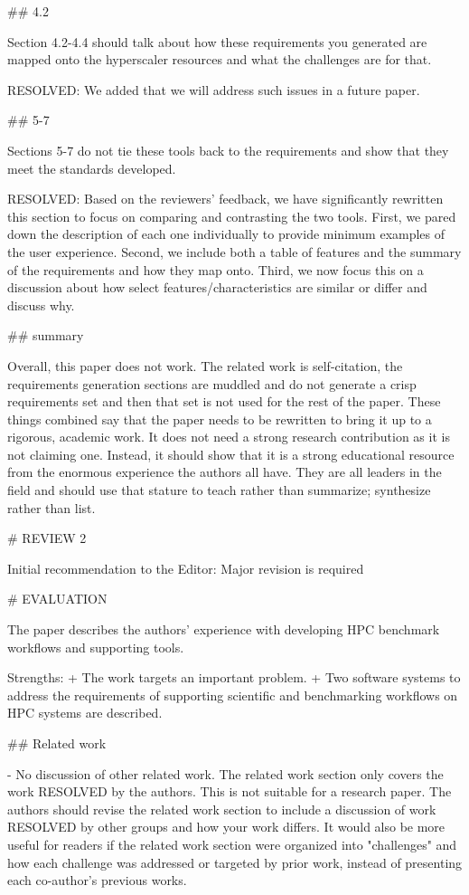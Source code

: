 ## 4.2

Section 4.2-4.4 should talk about how these requirements you generated are mapped onto the hyperscaler resources and what the challenges are for that.

    RESOLVED: We added that we will address such issues in a future paper.

## 5-7

Sections 5-7 do not tie these tools back to the requirements and show that they meet the standards developed.

    RESOLVED: Based on the reviewers' feedback, we have significantly rewritten this section to focus on comparing and contrasting the two tools. First, we pared down the description of each one individually to provide minimum examples of the user experience. Second, we include both a table of features and the summary of the requirements and how they map onto. Third, we now focus this on a discussion about how select features/characteristics are similar or differ and discuss why.

## summary

Overall, this paper does not work. The related work is self-citation, the requirements generation sections are muddled and do not generate a crisp requirements set and then that set is not used for the rest of the paper. These things combined say that the paper needs to be rewritten to bring it up to a rigorous, academic work. It does not need a strong research contribution as it is not claiming one. Instead, it should show that it is a strong educational resource from the enormous experience the authors all have. They are all leaders in the field and should use that stature to teach rather than summarize; synthesize rather than list.


# REVIEW 2

Initial recommendation to the Editor: Major revision is required

# EVALUATION
 
The paper describes the authors' experience with developing HPC benchmark workflows and supporting tools.

Strengths:
+ The work targets an important problem.
+ Two software systems to address the requirements of supporting scientific and benchmarking workflows on HPC systems are described.


## Related work

- No discussion of other related work. The related work section only covers the work RESOLVED by the authors. This is not suitable for a research paper. The authors should revise the related work section to include a discussion of work RESOLVED by other groups and how your work differs. It would also be more useful for readers if the related work section were organized into "challenges" and how each challenge was addressed or targeted by prior work, instead of presenting each co-author's previous works.

